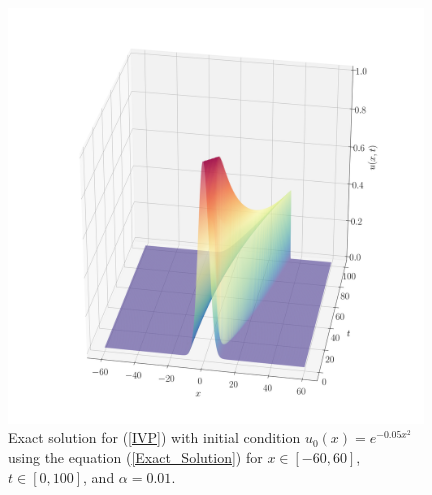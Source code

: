     \begin{figure}[H]
    	\centering
    	\includegraphics[width=11cm]{introduction/figures/Exact_Solution_alpha=001.png}
    	\caption{Exact solution for (\ref{IVP}) with initial condition $u_0 (x) = e^{-0.05x^2}$ using the equation (\ref{Exact_Solution}) for $x \in [-60, 60]$, $t \in [0, 100]$, and $\alpha = 0.01$.}
    	\label{Exact_Solution_alpha=0.01}
    \end{figure}